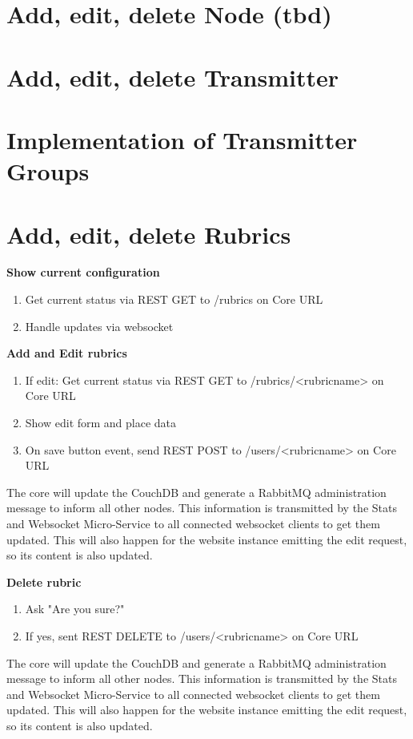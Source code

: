 \section{Add, edit, delete Node (tbd)}

\section{Add, edit, delete Transmitter}

\section{Implementation of Transmitter Groups}

\section{Add, edit, delete Rubrics}

\textbf{Show current configuration}
\begin{enumerate}
	\item Get current status via REST GET to /rubrics on Core URL
	\item Handle updates via websocket
\end{enumerate}

\textbf{Add and Edit rubrics}
\begin{enumerate}
	\item If edit: Get current status via REST GET to /rubrics/<rubricname> on Core URL
	\item Show edit form and place data
	\item On save button event, send REST POST to /users/<rubricname> on Core URL
\end{enumerate}
The core will update the CouchDB and generate a RabbitMQ administration message to inform all other nodes. This information is transmitted by the Stats and Websocket Micro-Service to all connected websocket clients to get them updated. This will also happen for the website instance emitting the edit request, so its content is also updated.


\textbf{Delete rubric}
\begin{enumerate}
	\item Ask "Are you sure?"
	\item If yes, sent REST DELETE to /users/<rubricname> on Core URL
\end{enumerate}
The core will update the CouchDB and generate a RabbitMQ administration message to inform all other nodes. This information is transmitted by the Stats and Websocket Micro-Service to all connected websocket clients to get them updated. This will also happen for the website instance emitting the edit request, so its content is also updated.

